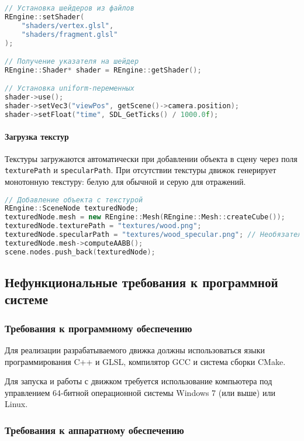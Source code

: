 \begin{lstlisting}[language=C++, caption=Пример настройки шейдеров]
// Установка шейдеров из файлов
REngine::setShader(
    "shaders/vertex.glsl",
    "shaders/fragment.glsl"
);

// Получение указателя на шейдер
REngine::Shader* shader = REngine::getShader();

// Установка uniform-переменных
shader->use();
shader->setVec3("viewPos", getScene()->camera.position);
shader->setFloat("time", SDL_GetTicks() / 1000.0f);
\end{lstlisting}

\paragraph{Загрузка текстур}

Текстуры загружаются автоматически при добавлении объекта в сцену через поля \texttt{texturePath} и \texttt{specularPath}. При отсутствии текстуры движок генерирует монотонную текстуру: белую для обычной и серую для отражений.

\begin{lstlisting}[language=C++, caption=Пример загрузки текстур]
// Добавление объекта с текстурой
REngine::SceneNode texturedNode;
texturedNode.mesh = new REngine::Mesh(REngine::Mesh::createCube());
texturedNode.texturePath = "textures/wood.png";
texturedNode.specularPath = "textures/wood_specular.png"; // Необязательно
texturedNode.mesh->computeAABB();
scene.nodes.push_back(texturedNode);
\end{lstlisting}

\subsection{Нефункциональные требования к программной системе}

\subsubsection{Требования к программному обеспечению}

Для реализации разрабатываемого движка должны использоваться языки программирования C++ и GLSL, компилятор GCC и система сборки CMake.

Для запуска и работы с движком требуется использование компьютера под управлением 64-битной операционной системы Windows 7 (или выше) или Linux.

\subsubsection{Требования к аппаратному обеспечению}


